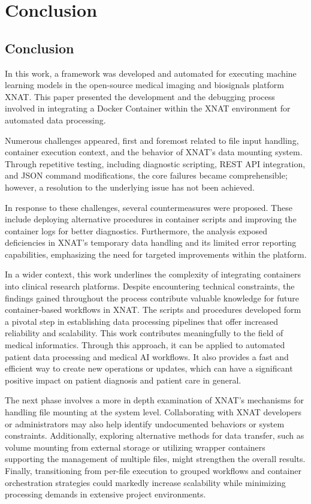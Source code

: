 

\chapter{Conclusion}

\section{Conclusion}
In this work, a framework was developed and automated for executing machine learning models in the open-source medical imaging and biosignals platform XNAT. This paper presented the development and the debugging process involved in integrating a Docker Container within the XNAT environment for automated data processing.

Numerous challenges appeared, first and foremost related to file input handling, container execution context, and the behavior of XNAT's data mounting system. Through repetitive testing, including diagnostic scripting, REST API integration, and JSON command modifications, the core failures became comprehensible; however, a resolution to the underlying issue has not been achieved.

In response to these challenges, several countermeasures were proposed. These include deploying alternative procedures in container scripts and improving the container logs for better diagnostics. Furthermore, the analysis exposed deficiencies in XNAT’s temporary data handling and its limited error reporting capabilities, emphasizing the need for targeted improvements within the platform.

In a wider context, this work underlines the complexity of integrating containers into clinical research platforms. Despite encountering technical constraints, the findings gained throughout the process contribute valuable knowledge for future container-based workflows in XNAT. The scripts and procedures developed form a pivotal step in establishing data processing pipelines that offer increased reliability and scalability. This work contributes meaningfully to the field of medical informatics. Through this approach, it can be applied to automated patient data processing and medical AI workflows. It also provides a fast and efficient way to create new operations or updates, which can have a significant positive impact on patient diagnosis and patient care in general.

The next phase involves a more in depth examination of XNAT's mechanisms for handling file mounting at the system level. Collaborating with XNAT developers or administrators may also help identify undocumented behaviors or system constraints. Additionally, exploring alternative methods for data transfer, such as volume mounting from external storage or utilizing wrapper containers supporting the management of multiple files, might strengthen the overall results. Finally, transitioning from per-file execution to grouped workflows and container orchestration strategies could markedly increase scalability while minimizing processing demands in extensive project environments. 

